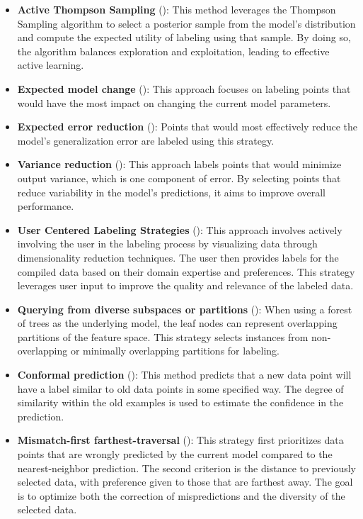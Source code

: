 \documentclass[
  letterpaper,
  numbers=noenddot,
  DIV=11]{scrreprt}
\theoremstyle{plain}
\theoremstyle{definition}
\theoremstyle{plain}
\theoremstyle{remark}
\begin{document}
\begin{itemize}
\item
  \textbf{Active Thompson Sampling}
  (): This
  method leverages the Thompson Sampling algorithm to select a posterior
  sample from the model's distribution and compute the expected utility
  of labeling using that sample. By doing so, the algorithm balances
  exploration and exploitation, leading to effective active learning.
\item
  \textbf{Expected model change} (): This approach focuses on labeling points that
  would have the most impact on changing the current model parameters.
\item
  \textbf{Expected error reduction}
  (): Points that
  would most effectively reduce the model's generalization error are
  labeled using this strategy.
\item
  \textbf{Variance reduction} (): This approach labels points that would
  minimize output variance, which is one component of error. By
  selecting points that reduce variability in the model's predictions,
  it aims to improve overall performance.
\item
  \textbf{User Centered Labeling Strategies}
  (): This approach
  involves actively involving the user in the labeling process by
  visualizing data through dimensionality reduction techniques. The user
  then provides labels for the compiled data based on their domain
  expertise and preferences. This strategy leverages user input to
  improve the quality and relevance of the labeled data.
\item
  \textbf{Querying from diverse subspaces or partitions}
  (): When using a forest of
  trees as the underlying model, the leaf nodes can represent
  overlapping partitions of the feature space. This strategy selects
  instances from non-overlapping or minimally overlapping partitions for
  labeling.
\item
  \textbf{Conformal prediction} (): This method predicts that a new
  data point will have a label similar to old data points in some
  specified way. The degree of similarity within the old examples is
  used to estimate the confidence in the prediction.
\item
  \textbf{Mismatch-first farthest-traversal}
  (): This
  strategy first prioritizes data points that are wrongly predicted by
  the current model compared to the nearest-neighbor prediction. The
  second criterion is the distance to previously selected data, with
  preference given to those that are farthest away. The goal is to
  optimize both the correction of mispredictions and the diversity of
  the selected data.
\end{itemize}
\end{document}
